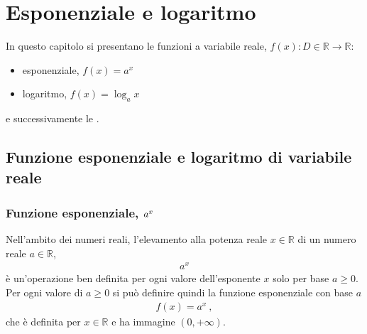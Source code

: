 \documentclass[letterpaper,10pt,italian]{jupyterBook}
\begin{document}
\chapter{Esponenziale e logaritmo}
\label{\detokenize{ch/precalculus/exponential_logarithm:esponenziale-e-logaritmo}}\label{\detokenize{ch/precalculus/exponential_logarithm:math-hs-exp-log}}\label{\detokenize{ch/precalculus/exponential_logarithm::doc}}
\sphinxAtStartPar
In questo capitolo si presentano le funzioni a variabile reale, \(f(x): D \in \mathbb{R} \rightarrow \mathbb{R}\):
\begin{itemize}
\item {} 
\sphinxAtStartPar
esponenziale, \(f(x) = a^x\)

\item {} 
\sphinxAtStartPar
logaritmo, \(f(x) = \log_a x\)

\end{itemize}

\sphinxAtStartPar
e successivamente le {\hyperref[\detokenize{ch/precalculus/exponential_logarithm:math-hs-exp-def-hyp}]{}}.


\section{Funzione esponenziale e logaritmo di variabile reale}
\label{\detokenize{ch/precalculus/exponential_logarithm:funzione-esponenziale-e-logaritmo-di-variabile-reale}}

\subsection{Funzione esponenziale, \protect\(a^x\protect\)}
\label{\detokenize{ch/precalculus/exponential_logarithm:funzione-esponenziale-a-x}}\label{\detokenize{ch/precalculus/exponential_logarithm:math-hs-exp-ax-def}}
\sphinxAtStartPar
Nell’ambito dei numeri reali, l’elevamento alla potenza reale \(x \in \mathbb{R}\) di un numero reale \(a \in \mathbb{R}\),
\begin{equation*}
\begin{split}a^x\end{split}
\end{equation*}
\sphinxAtStartPar
è un’operazione ben definita per ogni valore dell’esponente \(x\) solo per base \(a \geq 0\). Per ogni valore di \(a \geq 0\) si può definire quindi la funzione esponenziale con base \(a\)
\begin{equation*}
\begin{split}f(x) = a^x \ ,\end{split}
\end{equation*}
\sphinxAtStartPar
che è definita per \(x \in \mathbb{R}\) e ha immagine \((0, +\infty)\).
\end{document}

